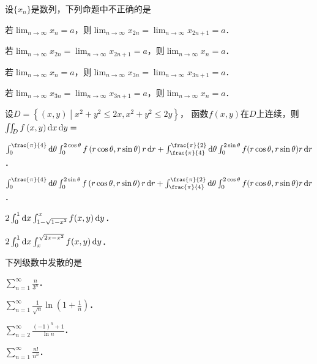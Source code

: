 \documentclass[plain,noanswer,medmath]{../../template/jnuexam}
\begin{document}






\begin{problem}
设$\{x_n\}$是数列，下列命题中不正确的是\pickout{}
\begin{abcd}
\item 若$\lim_{n\to\infty} x_n = a$，则$\lim_{n\to\infty} x_{2n} = \lim_{n \to \infty} x_{2n + 1} = a$．
\item 若$\lim_{n\to\infty} x_{2n} = \lim_{n\to\infty} x_{2n + 1} = a$，则$\lim_{n \to \infty} x_n = a$．
\item 若$\lim_{n\to\infty} x_n = a$，则$\lim_{n\to\infty} x_{3n} = \lim_{n \to \infty} x_{3n + 1} = a$．
\item 若$\lim_{n\to\infty} x_{3n} = \lim_{n\to\infty} x_{3n + 1} = a$，则$\lim_{n \to \infty} x_n = a$．
\end{abcd}
\end{problem}




\begin{problem}
设$D = \left\{(x,y) \middle| x^2 + y^2 \le 2x, x^2 + y^2 \le 2y \right\}$，
函数$f\left(x,y \right)$在$D$上连续，\goodbreak 则$\iint_D f\left(x,y \right)\mathop{}\!\mathrm{d} x\mathop{}\!\mathrm{d} y =$\pickout{}
\begin{abcd}
\item $\int_0^{\frac{\pi}{4}} \d\theta \int_0^{2\cos \theta} f\left(r\cos \theta ,r\sin \theta \right) r\dr 
 + \int_{\frac{\pi}{4}}^{\frac{\pi}{2}}\d\theta \int_0^{2\sin\theta}f(r\cos\theta,r\sin\theta)r\dr$．
\item $\int_0^{\frac{\pi}{4}} \d\theta \int_0^{2\sin \theta} f\left(r\cos \theta ,r\sin \theta \right) r\dr 
 + \int_{\frac{\pi}{4}}^{\frac{\pi}{2}} \d\theta \int_0^{2\cos \theta} f(r\cos\theta,r\sin\theta) r\dr$．
\item $2\int_0^1 \mathop{}\!\mathrm{d} x \int_{1 - \sqrt{1 - x^2}}^x f(x,y)\mathop{}\!\mathrm{d} y$．
\item $2\int_0^1 \mathop{}\!\mathrm{d} x \int_x^{\sqrt{2x - x^2}} f(x,y)\mathop{}\!\mathrm{d} y$．
\end{abcd}
\end{problem}


\begin{problem}
下列级数中发散的是\pickout{}
\begin{abcd}
\item $\sum_{n = 1}^{\infty}\frac{n}{3^n}$．
\item $\sum_{n = 1}^{\infty}\frac{1}{\sqrt{n}}\ln \left(1 + \frac{1}{n} \right)$．
\item $\sum_{n = 2}^{\infty}\frac{(- 1)^n + 1}{\ln n}$．
\item $\sum_{n = 1}^{\infty}\frac{n!}{n^n}$．
\end{abcd}
\end{problem}
\end{document}

